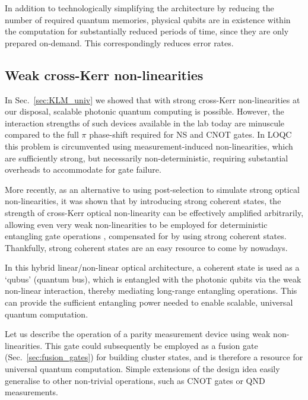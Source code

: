 In addition to technologically simplifying the architecture by reducing the number of required quantum memories, physical qubits are in existence within the computation for substantially reduced periods of time, since they are only prepared on-demand. This correspondingly reduces error rates.

%
%

\subsection{Weak cross-Kerr non-linearities} 

In Sec.~\ref{sec:KLM_univ} we showed that with strong cross-Kerr non-linearities at our disposal, scalable photonic quantum computing is possible. However, the interaction strengths of such devices available in the lab today are minuscule compared to the full $\pi$ phase-shift required for NS and CNOT gates. In LOQC this problem is circumvented using measurement-induced non-linearities, which are sufficiently strong, but necessarily non-deterministic, requiring substantial overheads to accommodate for gate failure. 

More recently, as an alternative to using post-selection to simulate strong optical non-linearities, it was shown that by introducing strong coherent states, the strength of  cross-Kerr optical non-linearity can be effectively amplified arbitrarily, allowing even very weak non-linearities to be employed for deterministic entangling gate operations \cite{bib:Munro05}, compensated for by using strong coherent states. Thankfully, strong coherent states are an easy resource to come by nowadays.

In this hybrid linear/non-linear optical architecture, a coherent state is used as a `qubus' (quantum bus), which is entangled with the photonic qubits via the weak non-linear interaction, thereby mediating long-range entangling operations. This can provide the sufficient entangling power needed to enable scalable, universal quantum computation.

Let us describe the operation of a parity measurement device using weak non-linearities. This gate could subsequently be employed as a fusion gate (Sec.~\ref{sec:fusion_gates}) for building cluster states, and is therefore a resource for universal quantum computation. Simple extensions of the design idea easily generalise to other non-trivial operations, such as CNOT gates or QND measurements. 

